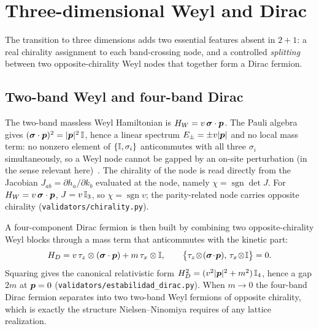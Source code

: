 \section{Three-dimensional Weyl and Dirac}
\label{p:weyl-dirac-3d}

The transition to three dimensions adds two essential features absent in
$2{+}1$: a real chirality assignment to each band-crossing node, and a
controlled \emph{splitting} between two opposite-chirality Weyl nodes
that together form a Dirac fermion.

\subsection{Two-band Weyl and four-band Dirac}
The two-band massless Weyl Hamiltonian is $H_{W} = v\,\bm{\sigma}\cdot\bm{p}$. The
Pauli algebra gives $(\bm{\sigma}\cdot\bm{p})^{2} = \lvert\bm{p}\rvert^{2}\,\mathbb{I}$,
hence a linear spectrum $E_{\pm}=\pm v\lvert\bm{p}\rvert$ and no local mass
term: no nonzero element of $\{\mathbb{I},\sigma_{i}\}$ anticommutes with all
three $\sigma_{i}$ simultaneously, so a Weyl node cannot be gapped by an
on-site perturbation (in the sense relevant here)~\cite{Burkov2018}. The
chirality of the node is read directly from the Jacobian
$J_{ab} = \partial h_{a}/\partial k_{b}$ evaluated at the node, namely
$\chi = \operatorname{sgn}\det J$. For $H_{W} = v\,\bm{\sigma}\cdot\bm{p}$,
$J=v\,\mathbb{I}_{3}$, so $\chi = \operatorname{sgn} v$; the parity-related node
carries opposite chirality
(\texttt{validators/chirality.py}).

A four-component Dirac fermion is then built by combining two
opposite-chirality Weyl blocks through a mass term that anticommutes
with the kinetic part:
\begin{equation}
H_{D} = v\,\tau_{z}\otimes(\bm{\sigma}\cdot\bm{p}) + m\,\tau_{x}\otimes\mathbb{I} ,
\qquad
\bigl\{\tau_{z}\!\otimes\!(\bm{\sigma}\!\cdot\!\bm{p}),\,\tau_{x}\!\otimes\!\mathbb{I}\bigr\} = 0 .
\end{equation}
Squaring gives the canonical relativistic form
$H_{D}^{2} = (v^{2}\lvert\bm{p}\rvert^{2}+m^{2})\,\mathbb{I}_{4}$, hence a gap $2m$
at $\bm{p}=0$ (\texttt{validators/estabilidad\_dirac.py}). When $m\to 0$ the
four-band Dirac fermion separates into two two-band Weyl fermions of
opposite chirality, which is exactly the structure Nielsen--Ninomiya
requires of any lattice realization.



